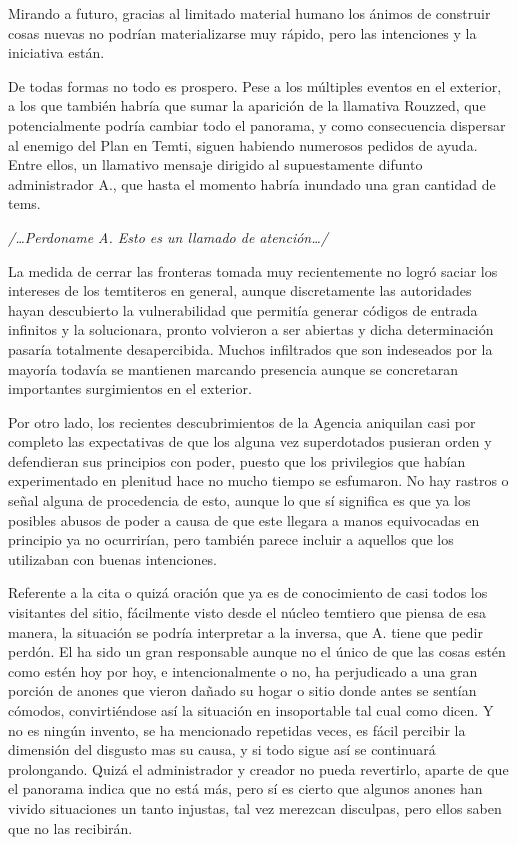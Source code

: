 \documentclass[
  spanish,
]{book}
\begin{document}
Mirando a futuro, gracias al limitado material humano los ánimos de construir cosas nuevas no podrían materializarse muy rápido, pero las intenciones y la iniciativa están.

De todas formas no todo es prospero. Pese a los múltiples eventos en el exterior, a los que también habría que sumar la aparición de la llamativa Rouzzed, que potencialmente podría cambiar todo el panorama, y como consecuencia dispersar al enemigo del Plan en Temti, siguen habiendo numerosos pedidos de ayuda. Entre ellos, un llamativo mensaje dirigido al supuestamente difunto administrador A., que hasta el momento habría inundado una gran cantidad de tems.

\emph{/\ldots Perdoname A. Esto es un llamado de atención\ldots/}

La medida de cerrar las fronteras tomada muy recientemente no logró saciar los intereses de los temtiteros en general, aunque discretamente las autoridades hayan descubierto la vulnerabilidad que permitía generar códigos de entrada infinitos y la solucionara, pronto volvieron a ser abiertas y dicha determinación pasaría totalmente desapercibida. Muchos infiltrados que son indeseados por la mayoría todavía se mantienen marcando presencia aunque se concretaran importantes surgimientos en el exterior.

Por otro lado, los recientes descubrimientos de la Agencia aniquilan casi por completo las expectativas de que los alguna vez superdotados pusieran orden y defendieran sus principios con poder, puesto que los privilegios que habían experimentado en plenitud hace no mucho tiempo se esfumaron. No hay rastros o señal alguna de procedencia de esto, aunque lo que sí significa es que ya los posibles abusos de poder a causa de que este llegara a manos equivocadas en principio ya no ocurrirían, pero también parece incluir a aquellos que los utilizaban con buenas intenciones.

Referente a la cita o quizá oración que ya es de conocimiento de casi todos los visitantes del sitio, fácilmente visto desde el núcleo temtiero que piensa de esa manera, la situación se podría interpretar a la inversa, que A. tiene que pedir perdón. El ha sido un gran responsable aunque no el único de que las cosas estén como estén hoy por hoy, e intencionalmente o no, ha perjudicado a una gran porción de anones que vieron dañado su hogar o sitio donde antes se sentían cómodos, convirtiéndose así la situación en insoportable tal cual como dicen. Y no es ningún invento, se ha mencionado repetidas veces, es fácil percibir la dimensión del disgusto mas su causa, y si todo sigue así se continuará prolongando. Quizá el administrador y creador no pueda revertirlo, aparte de que el panorama indica que no está más, pero sí es cierto que algunos anones han vivido situaciones un tanto injustas, tal vez merezcan disculpas, pero ellos saben que no las recibirán.
\end{document}
